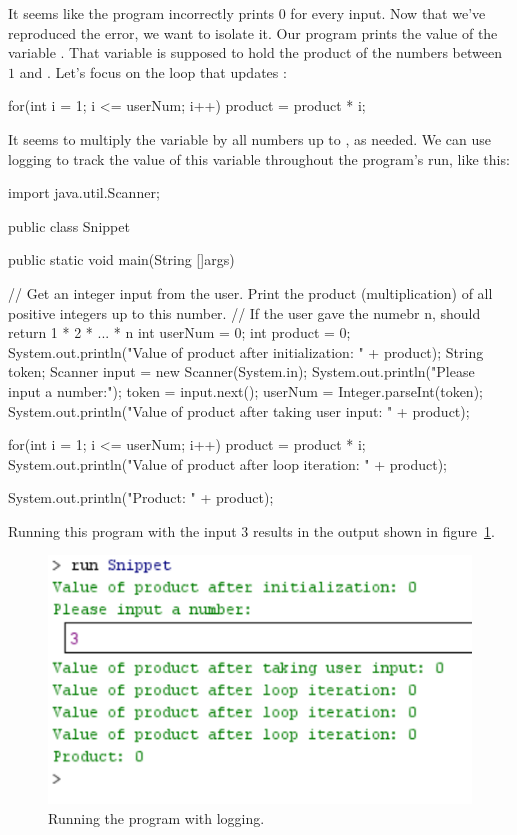 It seems like the program incorrectly prints $0$ for every input. Now that we've reproduced the error, we want to isolate it. Our program prints the value of the variable . That variable is supposed to hold the product of the numbers between $1$ and . Let's focus on the loop that updates :

\begin{code}
for(int i = 1; i <= userNum; i++){
    product = product * i;
}
\end{code}

It seems to multiply the variable by all numbers up to , as needed. We can use logging to track the value of this variable throughout the program's run, like this:

\begin{code}
import java.util.Scanner;

public class Snippet{
    public static void main(String []args){
        // Get an integer input from the user. Print the product (multiplication) of all positive integers up to this number.
        // If the user gave the numebr n, should return 1 * 2 * ... * n
        int userNum = 0;
        int product = 0;
        System.out.println("Value of product after initialization: " + product);
        String token;
        Scanner input = new Scanner(System.in);
        System.out.println("Please input a number:");
        token = input.next();
        userNum = Integer.parseInt(token);
        System.out.println("Value of product after taking user input: " + product);
        
        for(int i = 1; i <= userNum; i++){
            product = product * i;
            System.out.println("Value of product after loop iteration: " + product);
        }
        
        System.out.println("Product: " + product);
    }
}
\end{code}

Running this program with the input $3$ results in the output shown in figure~\ref{fig:logging}. 

\begin{figure}[h!]
\centering
\includegraphics[scale=0.8]{images/logging.PNG}
\caption{Running the program with logging.}
\label{fig:logging}
\end{figure}

